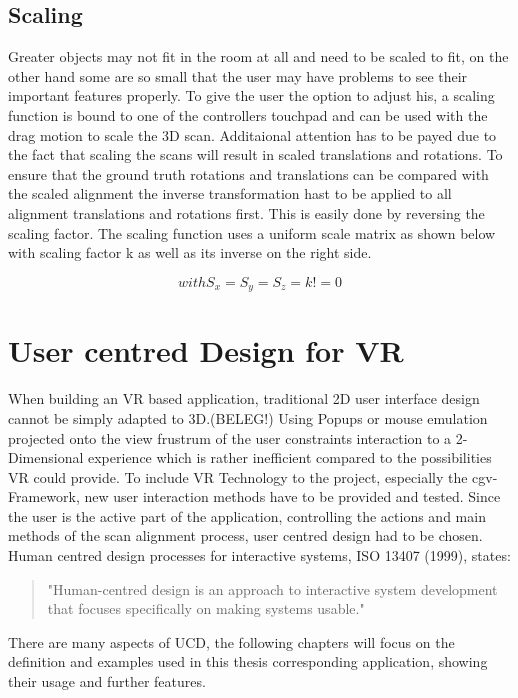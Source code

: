 \documentclass[hyperref,english,bachelorofscience,bibnum]{cgvpub}
\begin{document}
\subsection{Scaling}

Greater objects may not fit in the room at all and need to be scaled to fit, on the other hand some are so small that the user may have problems to see their important features properly. To give the user the option to adjust his, a scaling function is bound to one of the controllers touchpad and can be used with the drag motion to scale the 3D scan. Additaional attention has to be payed due to the fact that scaling the scans will result in scaled translations and rotations. To ensure that the ground truth rotations and translations can be compared with the scaled alignment the inverse transformation hast to be applied to all alignment translations and rotations first. This is easily done by reversing the scaling factor. The scaling function uses a uniform scale matrix as shown below with scaling factor k as well as its inverse on the right side.


\[
with S_x = S_y = S_z = k != 0
\]
\section{User centred Design for VR}

When building an VR based application, traditional 2D user interface design cannot be simply adapted to 3D.(BELEG!)
Using Popups or mouse emulation projected onto the view frustrum of the user constraints interaction to a 2-Dimensional experience which is rather inefficient compared to the possibilities VR could provide.
To include VR Technology to the project, especially the cgv-Framework, new user interaction methods have to be provided and tested. Since the user is the active part of the application, controlling the actions and main methods of the scan alignment process, user centred design had to be chosen. 
Human centred design processes for interactive systems, ISO 13407 (1999), states: 
\begin{quote}
"Human-centred design is an approach to interactive system development that focuses specifically on making systems usable."\cite{w3ucdISO}
\end{quote}
There are many aspects of UCD, the following chapters will focus on the definition and examples used in this thesis corresponding application, showing their usage and further features.
\end{document}
